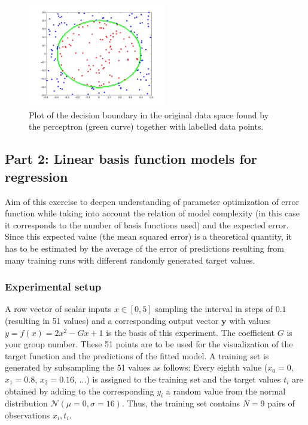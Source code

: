 \documentclass[a4]{article}
\begin{document}
\begin{figure}[!h]
\begin{center}
\centering
	\includegraphics[width=6cm]{figures/perceptron.pdf}
\end{center}
\caption{\label{fig:perceptron}Plot of the decision boundary in the original data space found by the perceptron (green curve) together with labelled data points.}
\end{figure}

\subsection{Part 2: Linear basis function models for regression}

Aim of this exercise to deepen understanding of parameter optimization of error function while taking into account the relation of model complexity (in this case it corresponds to the number of basis functions used) and the expected error. Since this expected value (the mean squared error) is a theoretical quantity, it has to be estimated by the average of the error of predictions resulting from many training runs with different randomly generated target values.

\subsubsection{Experimental setup}
A row vector of scalar inputs $x \in [0,5]$ sampling the interval in steps of $0.1$ (resulting in 51 values) and a corresponding output vector $\mathbf{y}$ with values $y = f(x) = 2x^2-Gx+1$ is the basis of this experiment. The coefficient $G$ is your group number. These 51 points are to be used for the visualization of the target function and the predictions of the fitted model.
A training set is generated by subsampling the 51 values as follows: Every eighth value ($x_0 = 0$, $x_1 = 0.8$, $x_2 = 0.16$, ...) is assigned to the training set and the target values $t_i$ are obtained by adding to the corresponding $y_i$ a random value from the normal distribution $\mathcal{N}(\mu = 0,\sigma = 16)$. Thus, the training set contains $N = 9$ pairs of observations $x_i, t_i$. 
\end{document}
